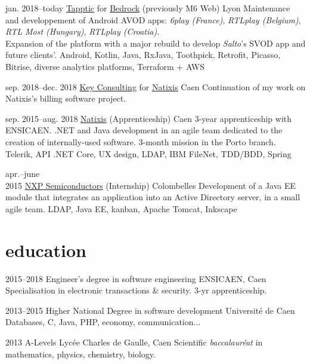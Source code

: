 \documentclass[]{friggeri-cv}
\begin{document}
\begin{entrylist}
    \entry
    {jan. 2018--today}
    {\href{https://www.tapptic.com}{Tapptic} \textnormal{for} \href{https://www.bedrockstreaming.com}{Bedrock} (previously M6 Web)}
    {Lyon}
    {Maintenance and developpement of Android AVOD apps: \emph{6play (France)}, \emph{RTLplay (Belgium)}, \emph{RTL Most (Hungary)}, \emph{RTLplay (Croatia)}. \\Expansion of the platform with a major rebuild to develop \emph{Salto}'s SVOD app and future clients'.}
    {Android, Kotlin, Java, RxJava, Toothpick, Retrofit, Picasso, Bitrise, diverse analytics platforms, Terraform + AWS}

    \entry
    {sep. 2018--dec. 2018}
    {\href{https://www.keyconsulting.fr}{Key Consulting} \textnormal{for} \href{https://www.natixis.com}{Natixis}}
    {Caen}
    {Continuation of my work on Natixis's billing software project.}{}

    \entry
    {sep. 2015--aug. 2018}
    {\href{https://www.natixis.com}{Natixis} \textnormal{(Apprenticeship)}}
    {Caen}
    {3-year apprenticeship with ENSICAEN. \csharp .NET and Java development in an agile team dedicated to the creation of internally-used software. 3-month mission in the Porto branch.}
    {Telerik, API .NET Core, UX design, LDAP, IBM FileNet, TDD/BDD, Spring}

    \entry
    {apr.--june\\2015}
    {\href{https://www.nxp.com}{NXP Semiconductors} \textnormal{(Internship)}}
    {Colombelles}
    {Development of a Java EE module that integrates an application into an Active Directory server, in a small agile team.}
    {LDAP, Java EE, kanban, Apache Tomcat, Inkscape}
\end{entrylist}

\section{education}

\begin{entrylist}
    \entry
    {2015--2018}
    {Engineer's degree {\normalfont in software engineering}}
    {ENSICAEN, Caen}
    {Specialisation in electronic transactions \& security. 3-yr apprenticeship.}{}

    \entry
    {2013--2015}
    {Higher National Degree {\normalfont in software development}}
    {Université de Caen}
    {Databases, C, Java, PHP, economy, communication...}{}

    \entry
    {2013}
    {A-Levels}
    {Lycée Charles de Gaulle, Caen}
    {Scientific \textit{baccalauréat} in mathematics, physics, chemistry, biology.}{}
\end{entrylist}
\end{document}

